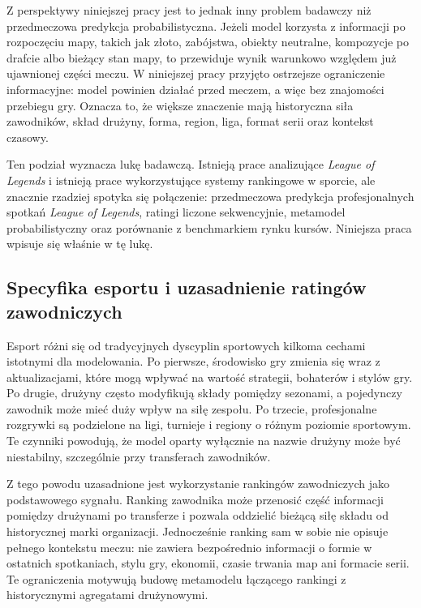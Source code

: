 Z perspektywy niniejszej pracy jest to jednak inny problem badawczy niż przedmeczowa predykcja
probabilistyczna. Jeżeli model korzysta z informacji po rozpoczęciu mapy, takich jak złoto,
zabójstwa, obiekty neutralne, kompozycje po drafcie albo bieżący stan mapy, to przewiduje wynik
warunkowo względem już ujawnionej części meczu. W niniejszej pracy przyjęto ostrzejsze ograniczenie
informacyjne: model powinien działać przed meczem, a więc bez znajomości przebiegu gry. Oznacza to,
że większe znaczenie mają historyczna siła zawodników, skład drużyny, forma, region, liga, format
serii oraz kontekst czasowy.

Ten podział wyznacza lukę badawczą. Istnieją prace analizujące \textit{League of Legends} i istnieją
prace wykorzystujące systemy rankingowe w sporcie, ale znacznie rzadziej spotyka się połączenie:
przedmeczowa predykcja profesjonalnych spotkań \textit{League of Legends}, ratingi liczone
sekwencyjnie, metamodel probabilistyczny oraz porównanie z benchmarkiem rynku kursów. Niniejsza
praca wpisuje się właśnie w tę lukę.

\subsection{Specyfika esportu i uzasadnienie ratingów zawodniczych}

Esport różni się od tradycyjnych dyscyplin sportowych kilkoma cechami istotnymi dla modelowania. Po
pierwsze, środowisko gry zmienia się wraz z aktualizacjami, które mogą wpływać na wartość strategii,
bohaterów i stylów gry. Po drugie, drużyny często modyfikują składy pomiędzy sezonami, a pojedynczy
zawodnik może mieć duży wpływ na siłę zespołu. Po trzecie, profesjonalne rozgrywki są podzielone na
ligi, turnieje i regiony o różnym poziomie sportowym. Te czynniki powodują, że model oparty
wyłącznie na nazwie drużyny może być niestabilny, szczególnie przy transferach zawodników.

Z tego powodu uzasadnione jest wykorzystanie rankingów zawodniczych jako podstawowego sygnału.
Ranking zawodnika może przenosić część informacji pomiędzy drużynami po transferze i pozwala
oddzielić bieżącą siłę składu od historycznej marki organizacji. Jednocześnie ranking sam w sobie
nie opisuje pełnego kontekstu meczu: nie zawiera bezpośrednio informacji o formie w ostatnich
spotkaniach, stylu gry, ekonomii, czasie trwania map ani formacie serii. Te ograniczenia motywują
budowę metamodelu łączącego rankingi z historycznymi agregatami drużynowymi.

